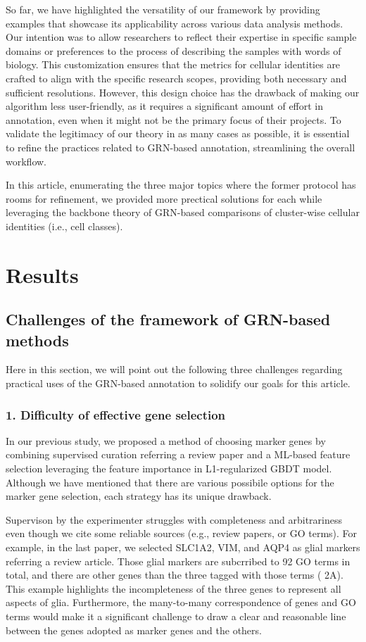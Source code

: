 \documentclass{article}
\begin{document}
So far, we have highlighted the versatility of our framework by providing examples that showcase its applicability 
across various data analysis methods. Our intention was to allow researchers to reflect their expertise in specific 
sample domains or preferences to the process of describing the samples with words of biology. This customization 
ensures that the metrics for cellular identities are crafted to align with the specific research scopes, providing both 
necessary and sufficient resolutions. However, this design choice has the drawback of making our algorithm less 
user-friendly, as it requires a significant amount of effort in annotation, even when it might not be the primary 
focus of their projects. To validate the legitimacy of our theory in as many cases as possible, it is essential to refine 
the practices related to GRN-based annotation, streamlining the overall workflow.

In this article, enumerating the three major topics where the former protocol has rooms for refinement, we 
provided more prectical solutions for each while leveraging the backbone theory of GRN-based comparisons of cluster-wise
cellular identities (i.e., cell classes).

\section*{Results}
\subsection*{Challenges of the framework of GRN-based methods}
Here in this section, we will point out the following three challenges regarding practical uses of the GRN-based 
annotation to solidify our goals for this article.

\subsubsection*{1. Difficulty of effective gene selection}
In our previous study, we proposed a method of choosing marker genes by combining supervised curation referring a review paper and a ML-based 
feature selection leveraging the feature importance in L1-regularized GBDT model. 
Although we have mentioned that there are various possibile options for the marker gene selection, each strategy has its unique drawback.

Supervison by the experimenter struggles with completeness and arbitrariness even though we cite some reliable 
sources (e.g., review papers, or GO terms). For example, in the last paper, we selected SLC1A2, VIM, and AQP4 
as glial markers referring a review article\cite{zhang2015molecular}. Those glial markers are subcrribed to 92 GO terms in total, and there 
are other genes than the three tagged with those terms (\figurename{ 2A}). This example highlights the incompleteness of 
the three genes to represent all aspects of glia. Furthermore, the many-to-many correspondence of genes and GO 
terms would make it a significant challenge to draw a clear and reasonable line between the genes adopted as 
marker genes and the others.
\end{document}

